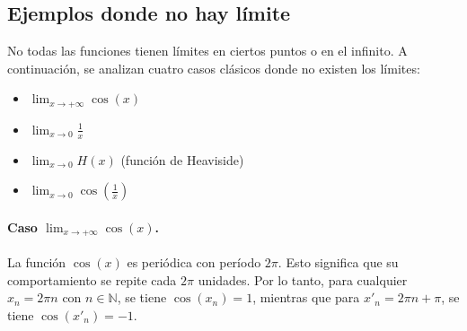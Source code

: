 \documentclass[12pt, a4paper]{article}
\theoremstyle{rioplatense}
\begin{document}

\subsection{Ejemplos donde no hay límite}


No todas las funciones tienen límites en ciertos puntos o en el infinito. A continuación, se analizan cuatro casos clásicos donde no existen los límites:
\begin{itemize}
    \item \(\lim_{x \to +\infty} \cos(x)\)
    \item \(\lim_{x \to 0} \frac{1}{x}\)
    \item \(\lim_{x \to 0} H(x)\) (función de Heaviside)
    \item \(\lim_{x \to 0} \cos\left(\frac{1}{x}\right)\)
\end{itemize}

\paragraph{Caso \(\lim_{x \to +\infty} \cos(x)\).}
La función \(\cos(x)\) es periódica con período \(2\pi\). Esto significa que su comportamiento se repite cada \(2\pi\) unidades. Por lo tanto, para cualquier \(x_n = 2\pi n\) con \(n \in \mathbb{N}\), se tiene \(\cos(x_n) = 1\), mientras que para \(x'_n = 2\pi n + \pi\), se tiene \(\cos(x'_n) = -1\).
\end{document}

